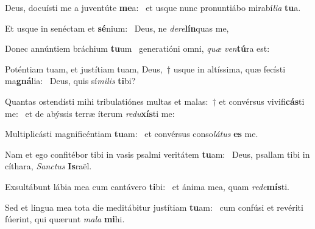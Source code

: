 \item Deus, docuísti me a juventúte \textbf{me}a:~\psstar{} et usque nunc pronuntiábo mirabí\textit{lia} \textbf{tu}a.
\item Et usque in senéctam et \textbf{sé}nium:~\psstar{} Deus, ne \textit{dere}\textbf{lín}quas me,
\item Donec annúntiem bráchium \textbf{tu}um~\psstar{} generatióni omni, \textit{quæ} \textit{ven}\textbf{tú}ra est:
\item Poténtiam tuam, et justítiam tuam, Deus,~† usque in altíssima, quæ fecísti ma\textbf{gná}lia:~\psstar{} Deus, quis sí\textit{milis} \textbf{ti}bi?
\item Quantas ostendísti mihi tribulatiónes multas et malas:~† et convérsus vivifi\textbf{cás}ti me:~\psstar{} et de abýssis terræ íterum \textit{redu}\textbf{xís}ti me:
\item Multiplicásti magnificéntiam \textbf{tu}am:~\psstar{} et convérsus conso\textit{látus} \textbf{es} me.
\item Nam et ego confitébor tibi in vasis psalmi veritátem \textbf{tu}am:~\psstar{} Deus, psallam tibi in cíthara, \textit{Sanctus} \textbf{Is}raël.
\item Exsultábunt lábia mea cum cantávero \textbf{ti}bi:~\psstar{} et ánima mea, quam \textit{rede}\textbf{mís}ti.
\item Sed et lingua mea tota die meditábitur justítiam \textbf{tu}am:~\psstar{} cum confúsi et revériti fúerint, qui quærunt \textit{mala} \textbf{mi}hi.
